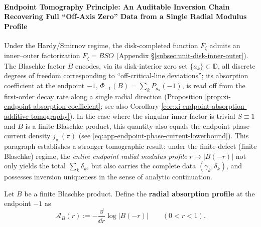 \paragraph{Endpoint Tomography Principle: An Auditable Inversion Chain Recovering Full ``Off-Axis Zero'' Data from a Single Radial Modulus Profile}\label{par:xi-endpoint-tomography-principle}
Under the Hardy/Smirnov regime, the disk-completed function \(F_{\zeta}\) admits an inner--outer factorization \(F_{\zeta}=BSO\) (Appendix \S\ref{subsec:unit-disk-inner-outer}).
The Blaschke factor \(B\) encodes, via its disk-interior zero set \(\{a_k\}\subset\mathbb{D}\), all discrete degrees of freedom corresponding to ``off-critical-line deviations''; its absorption coefficient at the endpoint \(-1\),
\(\Phi_{-1}(B)=\sum_k P_{a_k}(-1)\),
is read off from the first-order decay rate along a single radial direction (Proposition \ref{prop:xi-endpoint-absorption-coefficient}; see also Corollary \ref{cor:xi-endpoint-absorption-additive-tomography}).
In the case where the singular inner factor is trivial \(S\equiv 1\) and \(B\) is a finite Blaschke product, this quantity also equals the endpoint phase current density \(j_{\mathrm{in}}(\pi)\) (see \eqref{eq:app-endpoint-phase-current-lowerbound}).
This paragraph establishes a stronger tomographic result: under the finite-defect (finite Blaschke) regime, the \emph{entire endpoint radial modulus profile}
\(
r\mapsto |B(-r)|
\)
not only yields the total \(\sum_k\delta_k\), but also carries the complete data \((\gamma_k,\delta_k)\), and possesses inversion uniqueness in the sense of analytic continuation.

\begin{definition}\label{def:xi-endpoint-radial-absorption-profile}
Let \(B\) be a finite Blaschke product.
Define the \textbf{radial absorption profile} at the endpoint \(-1\) as
\begin{equation}\label{eq:xi-endpoint-radial-absorption-profile}
\boxed{\;
\mathcal{A}_B(r):=-\frac{\dd}{\dd r}\log|B(-r)|
\qquad(0<r<1).\;}
\end{equation}
\end{definition}

